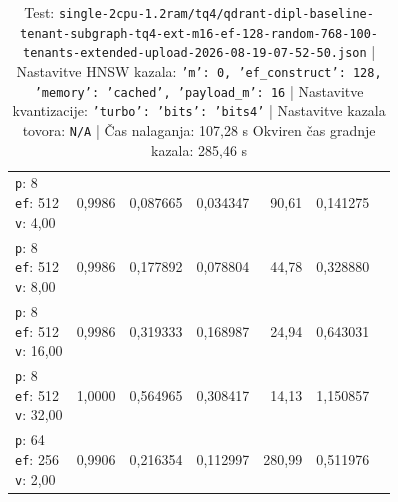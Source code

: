 \begin{table}[htbp]
\begin{tabularx}{\textwidth}{Xrrrrrr}
    \makecell{\texttt{p}: 8\\\texttt{ef}: 512\\\texttt{v}: 4,00} & 0,9986 & 0,087665 & 0,034347 & 90,61 & 0,141275 \\
    \makecell{\texttt{p}: 8\\\texttt{ef}: 512\\\texttt{v}: 8,00} & 0,9986 & 0,177892 & 0,078804 & 44,78 & 0,328880 \\
    \makecell{\texttt{p}: 8\\\texttt{ef}: 512\\\texttt{v}: 16,00} & 0,9986 & 0,319333 & 0,168987 & 24,94 & 0,643031 \\
    \makecell{\texttt{p}: 8\\\texttt{ef}: 512\\\texttt{v}: 32,00} & 1,0000 & 0,564965 & 0,308417 & 14,13 & 1,150857 \\
    \makecell{\texttt{p}: 64\\\texttt{ef}: 256\\\texttt{v}: 2,00} & 0,9906 & 0,216354 & 0,112997 & 280,99 & 0,511976 \\
    \bottomrule
  \end{tabularx}
\caption* {Test: \texttt{single-2cpu-1.2ram/tq4/qdrant-dipl-baseline-tenant-subgraph-tq4-ext-m16-ef-128-random-768-100-tenants-extended-upload-2026-08-19-07-52-50.json} | Nastavitve HNSW kazala: \texttt{{'m': 0, 'ef\_construct': 128, 'memory': 'cached', 'payload\_m': 16}} | Nastavitve kvantizacije: \texttt{{'turbo': {'bits': 'bits4'}}} | Nastavitve kazala tovora: \texttt{N/A} | Čas nalaganja: 107,28 s Okviren čas gradnje kazala: 285,46 s}\end{table}


